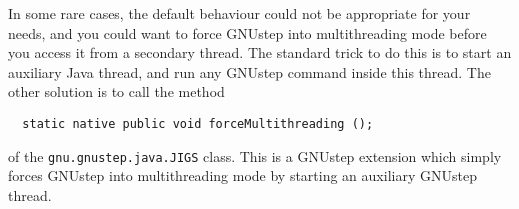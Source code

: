 In some rare cases, the default behaviour could not be appropriate for
your needs, and you could want to force GNUstep into multithreading
mode before you access it from a secondary thread.  The standard trick
to do this is to start an auxiliary Java thread, and run any GNUstep
command inside this thread.  The other solution is to call the method
\begin{verbatim}
  static native public void forceMultithreading ();
\end{verbatim}
of the \texttt{gnu.gnustep.java.JIGS} class.  This is a GNUstep
extension which simply forces GNUstep into multithreading mode by
starting an auxiliary GNUstep thread.
